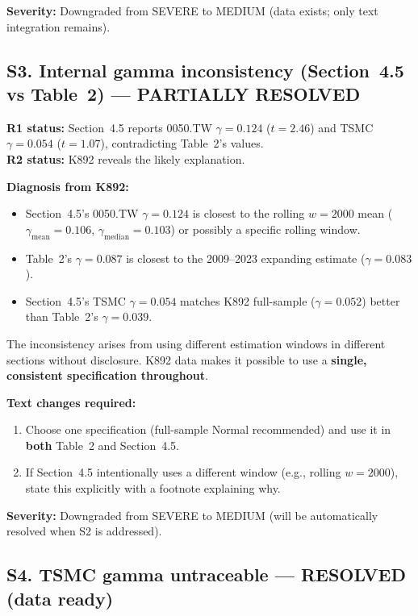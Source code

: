 \documentclass[12pt,a4paper]{article}
\begin{document}
\textbf{Severity:} \textcolor{fixedblue}{Downgraded from SEVERE to MEDIUM} (data exists; only text integration remains).

\bigskip

\subsection*{\textcolor{fixedblue}{S3. Internal gamma inconsistency (Section~4.5 vs Table~2) --- PARTIALLY RESOLVED}}

\textbf{R1 status:} Section~4.5 reports 0050.TW $\gamma = 0.124$ ($t = 2.46$) and TSMC $\gamma = 0.054$ ($t = 1.07$), contradicting Table~2's values.\\
\textbf{R2 status:} K892 reveals the likely explanation.

\medskip
\noindent\textbf{Diagnosis from K892:}
\begin{itemize}[nosep]
\item Section~4.5's 0050.TW $\gamma = 0.124$ is closest to the rolling $w=2000$ mean ($\gamma_{\text{mean}} = 0.106$, $\gamma_{\text{median}} = 0.103$) or possibly a specific rolling window.
\item Table~2's $\gamma = 0.087$ is closest to the 2009--2023 expanding estimate ($\gamma = 0.083$).
\item Section~4.5's TSMC $\gamma = 0.054$ matches K892 full-sample ($\gamma = 0.052$) better than Table~2's $\gamma = 0.039$.
\end{itemize}

The inconsistency arises from using different estimation windows in different sections without disclosure. K892 data makes it possible to use a \textbf{single, consistent specification throughout}.

\noindent\textbf{Text changes required:}
\begin{enumerate}[nosep]
\item Choose one specification (full-sample Normal recommended) and use it in \textbf{both} Table~2 and Section~4.5.
\item If Section~4.5 intentionally uses a different window (e.g., rolling $w=2000$), state this explicitly with a footnote explaining why.
\end{enumerate}

\textbf{Severity:} \textcolor{fixedblue}{Downgraded from SEVERE to MEDIUM} (will be automatically resolved when S2 is addressed).

\bigskip

\subsection*{\textcolor{fixedblue}{S4. TSMC gamma untraceable --- RESOLVED (data ready)}}
\end{document}
